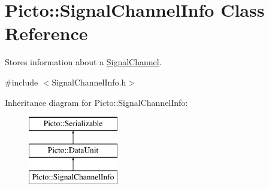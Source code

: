 \hypertarget{class_picto_1_1_signal_channel_info}{\section{Picto\-:\-:Signal\-Channel\-Info Class Reference}
\label{class_picto_1_1_signal_channel_info}
}


Stores information about a \hyperlink{class_picto_1_1_signal_channel}{Signal\-Channel}.  




{\ttfamily \#include $<$Signal\-Channel\-Info.\-h$>$}

Inheritance diagram for Picto\-:\-:Signal\-Channel\-Info\-:\begin{figure}[H]
\begin{center}
\leavevmode
\includegraphics[height=3.000000cm]{class_picto_1_1_signal_channel_info}
\end{center}
\end{figure}
